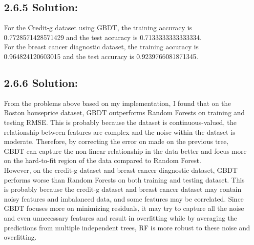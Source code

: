 \documentclass{article}
\begin{document}
\subsection*{2.6.5 Solution:}
For the Credit-g dataset using GBDT, the training accuracy is 0.7728571428571429 and the test accuracy is 0.7133333333333334. \\
For the breast cancer diagnostic dataset, the training accuracy is 0.964824120603015 and the test accuracy is 0.9239766081871345.

\subsection*{2.6.6 Solution:}
From the problems above based on my implementation, I found that on the Boston houseprice dataset, GBDT outperforms Random Forests on training and testing RMSE.
This is probably because the dataset is continuous-valued, the relationship between features are complex and the noise within the dataset is moderate. Therefore, by correcting the error on made on the previous tree, GBDT can 
capture the non-linear relationship in the data better and focus more on the hard-to-fit region of the data compared to Random Forest.\\
However, on the credit-g dataset and breast cancer diagnostic dataset, GBDT performs worse than Random Forests on both training and testing dataset. This is probably because the credit-g dataset and breast cancer dataset may
contain noisy features and imbalanced data, and some features may be correlated. Since GBDT focuses more on minimizing residuals, it may try to capture all the noise and even unnecessary features and result in overfitting while by averaging the predictions from multiple independent trees, RF is more robust to these noise and overfitting.
\end{document}
